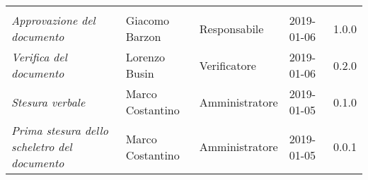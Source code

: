 \newpage 
\section*{}
\begin{table}[H]
	\centering
	\begin{tabular}{p{4cm}|C{3cm}|C{3cm}|R{2.5cm}|R{2cm}}
		
		 & & & & \\
		
		
		\emph{Approvazione del documento} &  Giacomo Barzon & Responsabile & 2019-01-06 & 1.0.0 \\
		\hline
		
		\emph{Verifica del documento} & Lorenzo Busin & Verificatore & 2019-01-06 & 0.2.0 \\
		\hline

		\emph{Stesura verbale} & Marco Costantino & Amministratore & 2019-01-05 & 0.1.0 \\
		\hline
		
		\emph{Prima stesura dello scheletro del documento} & Marco Costantino & Amministratore & 2019-01-05 & 0.0.1 \\
		
	\end{tabular}
	
\end{table}


\clearpage